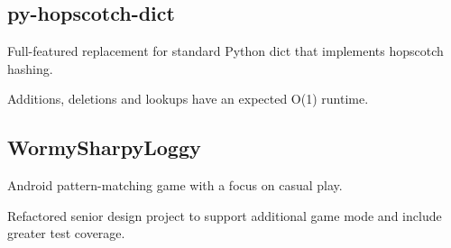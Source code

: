\documentclass[]{deedy-resume-openfont}
\begin{document}
\begin{minipage}[t]{0.64\textwidth}
\subsection{py-hopscotch-dict}
\vspace{\topsep} %
\begin{tightemize}
\item Full-featured replacement for standard Python dict that implements hopscotch hashing.
\item Additions, deletions and lookups have an expected O(1) runtime.
\end{tightemize}
\sectionsep

%

\subsection{WormySharpyLoggy}
\vspace{\topsep} %
\begin{tightemize}
\item Android pattern-matching game with a focus on casual play.
\item Refactored senior design project to support additional game mode and include greater test coverage.
\end{tightemize}
\sectionsep


\end{minipage}
\end{document}
